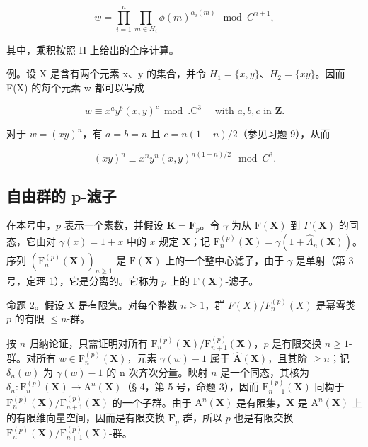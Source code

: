 \[
w = \prod_ {i = 1} ^ {n} \prod_ {m \in H _ {i}} \phi (m) ^ {\alpha_ {i} (m)} \mod C ^ {n + 1},\tag{4}
\]

其中，乘积按照 H 上给出的全序计算。

例。设 X 是含有两个元素 x、y 的集合，并令 \(H_{1} = \{x, y\}\)、\(H_{2} = \{xy\}\)。因而 F(X) 的每个元素 w 都可以写成

\[
w \equiv x ^ {a} y ^ {b} (x, y) ^ {c} \bmod . \mathrm{C} ^ {3} \quad \text { with } a, b, c \text { in } \mathbf {Z}.
\]

对于 \(w = (xy)^n\)，有 \(a = b = n\) 且 \(c = n(1 - n)/2\)（参见习题 9），从而

\[
(x y) ^ {n} \equiv x ^ {n} y ^ {n} (x, y) ^ {n (1 - n) / 2} \mod C ^ {3}.
\]

\subsection{自由群的 p-滤子}

在本号中，\(p\) 表示一个素数，并假设 \(\mathbf{K} = \mathbf{F}_p\)。令 \(\gamma\) 为从 \(\mathrm{F}(\mathbf{X})\) 到 \(\Gamma(\mathbf{X})\) 的同态，它由对 \(\gamma(x) = 1 + x\) 中的 \(x\) 规定 \(\mathbf{X}\)；记 \(\mathrm{F}_n^{(p)}(\mathbf{X}) = \gamma(1 + \hat{\Lambda}_n(\mathbf{X}))\)。序列 \((\mathrm{F}_n^{(p)}(\mathbf{X}))_{n\geq 1}\) 是 \(\mathrm{F}(\mathbf{X})\) 上的一个整中心滤子，由于 \(\gamma\) 是单射（第 3 号，定理 1），它是分离的。它称为 \(p\) 上的 \(\mathrm{F}(\mathbf{X})\)-滤子。

命题 2。假设 X 是有限集。对每个整数 \(n \geqslant 1\)，群 \(F(X) / F_n^{(p)}(X)\) 是幂零类 \(p\) 的有限 \(\leqslant n\)-群。

按 \(n\) 归纳论证，只需证明对所有 \(\mathrm{F}_{n}^{(p)}(\mathbf{X}) / \mathrm{F}_{n + 1}^{(p)}(\mathbf{X})\)，\(p\) 是有限交换 \(n \geqslant 1\)-群。对所有 \(w \in \mathrm{F}_{n}^{(p)}(\mathbf{X})\)，元素 \(\gamma(w) - 1\) 属于 \(\hat{\mathbf{A}}(\mathbf{X})\)，且其阶 \(\geqslant n\)；记 \(\delta_n(w)\) 为 \(\gamma(w) - 1\) 的 n 次齐次分量。映射 \(n\) 是一个同态，其核为 \(\delta_n: \mathrm{F}_{n}^{(p)}(\mathbf{X}) \to \mathrm{A}^n (\mathbf{X})\)（§ 4，第 5 号，命题 3），因而 \(\mathrm{F}_{n + 1}^{(p)}(\mathbf{X})\) 同构于 \(\mathrm{F}_{n}^{(p)}(\mathbf{X}) / \mathrm{F}_{n + 1}^{(p)}(\mathbf{X})\) 的一个子群。由于 \(\mathrm{A}^n (\mathbf{X})\) 是有限集，\(\mathbf{X}\) 是 \(\mathrm{A}^n (\mathbf{X})\) 上的有限维向量空间，因而是有限交换 \(\mathbf{F}_p\)-群，所以 \(p\) 也是有限交换 \(\mathrm{F}_{n}^{(p)}(\mathbf{X}) / \mathrm{F}_{n + 1}^{(p)}(\mathbf{X})\)-群。

